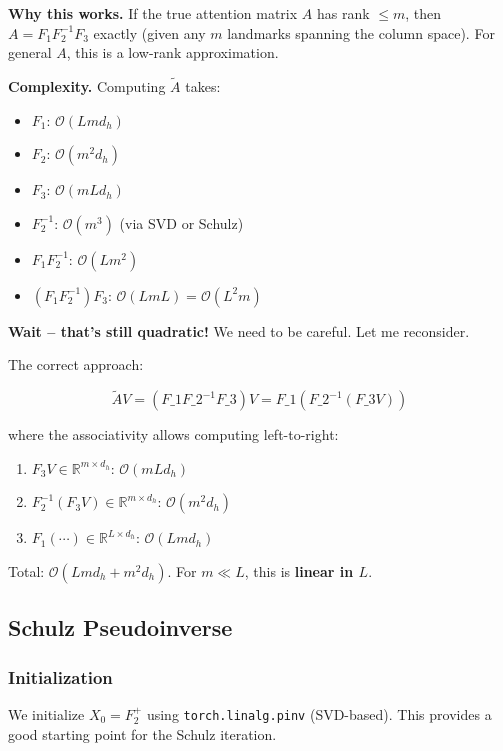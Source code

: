 \textbf{Why this works.} If the true attention matrix $A$ has rank $\le m$, then 
$A = F_1 F_2^{-1} F_3$ exactly (given any $m$ landmarks spanning the column 
space). For general $A$, this is a low-rank approximation.

\textbf{Complexity.} Computing $\tilde{A}$ takes:

\begin{itemize}
\item $F_1$: $\mathcal{O}(L m d_h)$
\item $F_2$: $\mathcal{O}(m^2 d_h)$
\item $F_3$: $\mathcal{O}(m L d_h)$
\item $F_2^{-1}$: $\mathcal{O}(m^3)$ (via SVD or Schulz)
\item $F_1 F_2^{-1}$: $\mathcal{O}(L m^2)$
\item $(F_1 F_2^{-1}) F_3$: $\mathcal{O}(L m L) = \mathcal{O}(L^2 m)$

\end{itemize}
\textbf{Wait -- that's still quadratic!} We need to be careful. Let me reconsider.

The correct approach:

\[
\tilde{A} V = (F\_1 F\_2^{-1} F\_3) V = F\_1 (F\_2^{-1} (F\_3 V))
\]

where the associativity allows computing left-to-right:

\begin{enumerate}
\item $F_3 V \in \mathbb{R}^{m \times d_h}$: $\mathcal{O}(m L d_h)$
\item $F_2^{-1} (F_3 V) \in \mathbb{R}^{m \times d_h}$: $\mathcal{O}(m^2 d_h)$
\item $F_1 (\cdots) \in \mathbb{R}^{L \times d_h}$: $\mathcal{O}(L m d_h)$

\end{enumerate}
Total: $\mathcal{O}(L m d_h + m^2 d_h)$. For $m \ll L$, this is \textbf{linear in $L$}.

\subsection{Schulz Pseudoinverse}

\subsubsection{Initialization}

We initialize $X_0 = F_2^+$ using \texttt{torch.linalg.pinv} (SVD-based). This 
provides a good starting point for the Schulz iteration.

